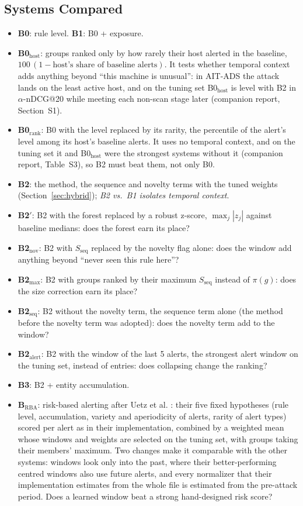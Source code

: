 \documentclass[conference]{IEEEtran}
\begin{document}
\subsection{Systems Compared}

\begin{itemize}
\item \textbf{B0}: rule level. \textbf{B1}: B0 + exposure.
\item \textbf{B0$_\mathrm{host}$}: groups ranked only by how rarely their host alerted in the baseline, $100\,(1 - \text{host's share of baseline alerts})$. It tests whether temporal context adds anything beyond ``this machine is unusual'': in AIT-ADS the attack lands on the least active host, and on the tuning set B0$_\mathrm{host}$ is level with B2 in $\alpha$-nDCG@20 while meeting each non-scan stage later (companion report, Section~S1).
\item \textbf{B0$_\mathrm{rank}$}: B0 with the level replaced by its rarity, the percentile of the alert's level among its host's baseline alerts. It uses no temporal context, and on the tuning set it and B0$_\mathrm{host}$ were the strongest systems without it (companion report, Table~S3), so B2 must beat them, not only B0.
\item \textbf{B2}: the method, the sequence and novelty terms with the tuned weights (Section~\ref{sec:hybrid}); \emph{B2 vs.\ B1 isolates temporal context}.
\item \textbf{B2$'$}: B2 with the forest replaced by a robust z-score, $\max_j |z_j|$ against baseline medians: does the forest earn its place?
\item \textbf{B2$_\mathrm{nov}$}: B2 with $S_\mathrm{seq}$ replaced by the novelty flag alone: does the window add anything beyond ``never seen this rule here''?
\item \textbf{B2$_\mathrm{max}$}: B2 with groups ranked by their maximum $S_\mathrm{seq}$ instead of $\pi(g)$: does the size correction earn its place?
\item \textbf{B2$_\mathrm{seq}$}: B2 without the novelty term, the sequence term alone (the method before the novelty term was adopted): does the novelty term add to the window?
\item \textbf{B2$_\mathrm{alert}$}: B2 with the window of the last 5 alerts, the strongest alert window on the tuning set, instead of entries: does collapsing change the ranking?
\item \textbf{B3}: B2 + entity accumulation.
\item \textbf{B$_\mathrm{RBA}$}: risk-based alerting after Uetz et al. \cite{ref26}: their five fixed hypotheses (rule level, accumulation, variety and aperiodicity of alerts, rarity of alert types) scored per alert as in their implementation, combined by a weighted mean whose windows and weights are selected on the tuning set, with groups taking their members' maximum. Two changes make it comparable with the other systems: windows look only into the past, where their better-performing centred windows also use future alerts, and every normalizer that their implementation estimates from the whole file is estimated from the pre-attack period. Does a learned window beat a strong hand-designed risk score?
\end{itemize}
\end{document}
